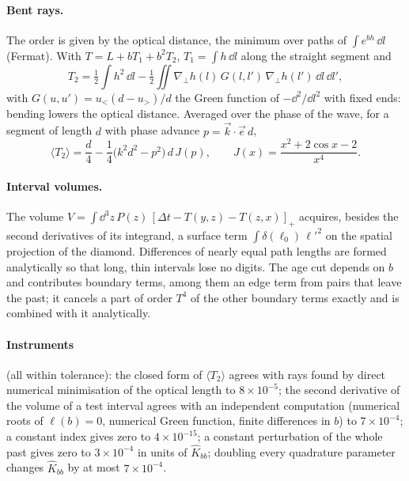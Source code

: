 \paragraph{Bent rays.} The order is given by the optical distance, the minimum over paths of
$\int e^{bh}\,\dd l$ (Fermat). With $T=L+bT_1+b^2T_2$, $T_1=\int h\,\dd l$ along the straight segment and
\begin{equation}
  T_2=\tfrac12\!\int h^2\,\dd l-\tfrac12\!\iint\nabla_{\!\perp}h(l)\,G(l,l')\,\nabla_{\!\perp}h(l')\,\dd l\,\dd l',
\end{equation}
with $G(u,u')=u_<(d-u_>)/d$ the Green function of $-\dd^2/\dd l^2$ with fixed ends: bending lowers the optical
distance. Averaged over the phase of the wave, for a segment of length $d$ with phase advance $p=\vec k\cdot\vec e\,d$,
\begin{equation}
  \langle T_2\rangle=\frac d4-\frac14\big(k^2d^2-p^2\big)\,d\,J(p),\qquad J(x)=\frac{x^2+2\cos x-2}{x^4}.
\end{equation}

\paragraph{Interval volumes.} The volume $V=\int\dd^3z\,P(z)\,[\Delta t-T(y,z)-T(z,x)]_+$ acquires, besides the
second derivatives of its integrand, a surface term $\int\delta(\ell_0)\,\ell'^2$ on the spatial projection of
the diamond. Differences of nearly equal path lengths are formed analytically so that long, thin intervals
lose no digits. The age cut depends on $b$ and contributes boundary terms, among them an edge term from pairs
that leave the past; it cancels a part of order $T^4$ of the other boundary terms exactly and is combined with
it analytically.

\paragraph{Instruments} (all within tolerance): the closed form of $\langle T_2\rangle$ agrees with rays found by
direct numerical minimisation of the optical length to $8\times10^{-5}$; the second derivative of the volume of
a test interval agrees with an independent computation (numerical roots of $\ell(b)=0$, numerical Green
function, finite differences in $b$) to $7\times10^{-4}$; a constant index gives zero to $4\times10^{-15}$; a
constant perturbation of the whole past gives zero to $3\times10^{-4}$ in units of $\hat K_{bb}$; doubling every
quadrature parameter changes $\hat K_{bb}$ by at most $7\times10^{-4}$.


